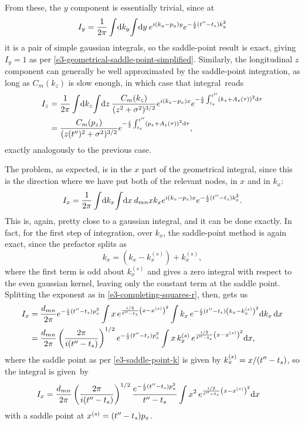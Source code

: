 From these, the $y$ component is essentially trivial, since at
\begin{equation}
I_y
=
\frac{1}{2\pi}
\int \! \mathrm{d} k_y \! \int \! \mathrm{d} y \:
e^{i(k_y-p_y)y}
e^{-\frac{i}{2} (t''-{t_s})k_y^2}
\end{equation}
it is a pair of simple gaussian integrals, so the saddle-point result is exact, giving $I_y=1$ as per \eqref{e3-geometrical-saddle-point-simplified}. Similarly, the longitudinal $z$ component can generally be well approximated by the saddle-point integration, as long as $C_m(k_z)$ is slow enough, in which case that integral~reads
\begin{align}
I_z
& =
\frac{1}{2\pi}
\int \! \mathrm{d} k_z \! \int \! \mathrm{d} z \:
\frac{C_m(k_z)}{(z^2+\sigma^2)^{3/2}}
e^{i(k_x-p_x)x}
e^{-\frac{i}{2} \int_{{t_s}}^{t''}\left(k_z+A_z(\tau)\right)^2\mathrm{d}\tau}
\nonumber \\ & =
\frac{C_m(p_z)}{(z(t'')^2+\sigma^2)^{3/2}}
e^{-\frac{i}{2} \int_{{t_s}}^{t''}\left(p_z+A_z(\tau)\right)^2\mathrm{d}\tau}
,
\end{align}
exactly analogously to the previous case.


The problem, as expected, is in the $x$ part of the geometrical integral, since this is the direction where we have put both of the relevant nodes, in $x$ and in $k_x$:
\begin{equation}
I_x
=
\frac{1}{2\pi}
\int \! \mathrm{d} k_x \! \int \! \mathrm{d} x \:
d_{mn}x k_x
e^{i(k_x-p_x)x}
e^{-\frac{i}{2} (t''-{t_s})k_x^2}
.
\end{equation}
This is, again, pretty close to a gaussian integral, and it can be done exactly. In fact, for the first step of integration, over $k_x$, the saddle-point method is again exact, since the prefactor splits as
\begin{equation}
k_x=(k_x-k_x^{(s)})+k_x^{(s)},
\end{equation}
where the first term is odd about $k_x^{(s)}$ and gives a zero integral with respect to the even gaussian kernel, leaving only the constant term at the saddle point. Splitting the exponent as in \eqref{e3-completing-squares-r}, then, gets us
\begin{align}
I_x
& =
\frac{d_{mn}}{2\pi}
e^{-\frac{i}{2} (t''-{t_s})p_x^2}
\int 
x \,
e^{\frac{i/2}{t''-{t_s}}\left(x-x^{(s)}\right)^2}
\int 
k_x\,
e^{-\frac{i}{2} (t''-{t_s})\left(k_x-k_x^{(s)}\right)^2} 
\mathrm{d} k_x \,
\mathrm{d} x
\nonumber \\ & =
\frac{d_{mn}}{2\pi}
\left(
 \frac{2\pi}{i(t''-{t_s})}
 \right)^{1/2}
e^{-\frac{i}{2} (t''-{t_s})p_x^2}
\int 
x \,
k_x^{(s)} \,
e^{\frac{i/2}{t''-{t_s}}\left(x-x^{(s)}\right)^2}
\mathrm{d} x
,
\label{e3-Ix-integral-after-k-integration}
\end{align}
where the saddle point as per \eqref{e3-saddle-point-k} is given by $k_x^{(s)}= x/(t''-{t_s})$, so the integral is given~by
\begin{align}
I_x
& =
\frac{d_{mn}}{2\pi}
\left(
 \frac{2\pi}{i(t''-{t_s})}
 \right)^{1/2}
\frac{
 e^{-\frac{i}{2} (t''-{t_s})p_x^2}
 }{t''-{t_s}}
\int 
x^2 \,
e^{\frac{i/2}{t''-{t_s}}\left(x-x^{(s)}\right)^2}
\mathrm{d} x
\label{e3-Ix-integral-with-x2-node}
\end{align}
with a saddle point at $x^{(s)}=(t''-{t_s})p_x$.

